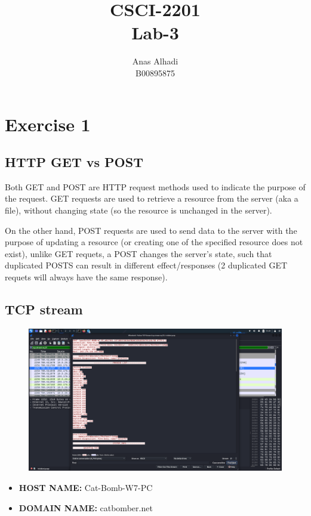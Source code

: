 \documentclass{article}
\title{\textbf{CSCI-2201\\Lab-3}}
\author{Anas Alhadi\\B00895875}
\numberwithin{equation}{subsection}
\begin{document}
	\maketitle
	
	\section{Exercise 1}
	\subsection{HTTP GET vs POST}

	\par{
		Both GET and POST are HTTP request methods used to indicate the purpose of the
		request. GET requests are used to retrieve a resource from the server (aka a file), without
		changing state (so the resource is unchanged in the server). 
	}

	\par{
		On the other hand, POST requests are used to send data to the server with the purpose
		of updating a resource (or creating one of the specified resource does not exist), unlike GET
		requets, a POST changes the server's state, such that duplicated POSTS can
		result in different effect/responses (2 duplicated GET requets will always have the same response).
	}

	\subsection{TCP stream}
	\begin{figure}[H]
		\includegraphics[width=400pt]{pics/1.png}
	\end{figure}

	\begin{itemize}
		\item \textbf{HOST NAME:} Cat-Bomb-W7-PC
		\item \textbf{DOMAIN NAME:} catbomber.net
	\end{itemize}
\end{document}

